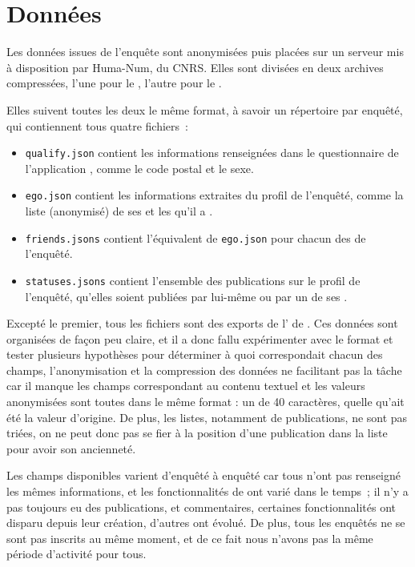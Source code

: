 
\section{Données}

Les données issues de l’enquête sont anonymisées puis placées sur un serveur
mis à disposition par Huma-Num,  du CNRS. Elles sont divisées en deux archives compressées, l’une pour
le , l’autre pour le .

Elles suivent toutes les deux le même format, à savoir un répertoire par
enquêté, qui contiennent tous quatre fichiers~:

\begin{itemize}
    \item \texttt{qualify.json} contient les informations renseignées dans le
        questionnaire de l’application , comme le code postal et le
        sexe.
    \item \texttt{ego.json} contient les informations extraites du profil de
        l’enquêté, comme la liste (anonymisé) de ses  et les 
        qu’il a .
    \item \texttt{friends.jsons} contient l’équivalent de \texttt{ego.json}
        pour chacun des  de l’enquêté.
    \item \texttt{statuses.jsons} contient l’ensemble des publications sur le
        profil de l’enquêté, qu’elles soient publiées par lui-même ou par un de
        ses .
\end{itemize}

Excepté le premier, tous les fichiers sont des exports de l’\api{} de
\fb{}. Ces données sont organisées de façon peu claire, et il a donc
fallu expérimenter avec le format et tester plusieurs hypothèses pour
déterminer à quoi correspondait chacun des champs, l’anonymisation et la
compression des données ne facilitant pas la tâche car il manque les champs
correspondant au contenu textuel et les valeurs anonymisées sont toutes dans le
même format : un  de 40 caractères, quelle qu’ait été la valeur
d’origine. De plus, les listes, notamment de publications, ne sont pas triées,
on ne peut donc pas se fier à la position d’une publication dans la liste pour
avoir son ancienneté.

Les champs disponibles varient d’enquêté à enquêté car tous n’ont pas
renseigné les mêmes informations, et les fonctionnalités de \fb{} ont
varié dans le temps~; il n’y a pas toujours eu des publications,  et
commentaires, certaines fonctionnalités ont disparu depuis leur création,
d'autres ont évolué. De plus, tous les enquêtés ne se sont pas inscrits au même
moment, et de ce fait nous n’avons pas la même période d’activité pour tous.

